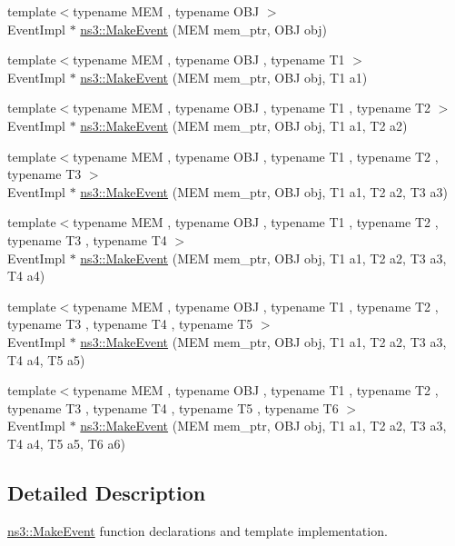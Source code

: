 {\bf }\par
\begin{DoxyCompactItemize}
\item 
{\footnotesize template$<$typename M\+EM , typename O\+BJ $>$ }\\Event\+Impl $\ast$ \hyperlink{group__makeeventmemptr_ga0e2905b2f105d6626b91262ed831c6fa}{ns3\+::\+Make\+Event} (M\+EM mem\+\_\+ptr, O\+BJ obj)
\item 
{\footnotesize template$<$typename M\+EM , typename O\+BJ , typename T1 $>$ }\\Event\+Impl $\ast$ \hyperlink{group__makeeventmemptr_ga910b4f11ac95304bc98e165f17c39126}{ns3\+::\+Make\+Event} (M\+EM mem\+\_\+ptr, O\+BJ obj, T1 a1)
\item 
{\footnotesize template$<$typename M\+EM , typename O\+BJ , typename T1 , typename T2 $>$ }\\Event\+Impl $\ast$ \hyperlink{group__makeeventmemptr_ga3e867e45d5a45ba42ab0648d999c71c4}{ns3\+::\+Make\+Event} (M\+EM mem\+\_\+ptr, O\+BJ obj, T1 a1, T2 a2)
\item 
{\footnotesize template$<$typename M\+EM , typename O\+BJ , typename T1 , typename T2 , typename T3 $>$ }\\Event\+Impl $\ast$ \hyperlink{group__makeeventmemptr_ga845eade6a6e8eee2b7c45225fe9816b2}{ns3\+::\+Make\+Event} (M\+EM mem\+\_\+ptr, O\+BJ obj, T1 a1, T2 a2, T3 a3)
\item 
{\footnotesize template$<$typename M\+EM , typename O\+BJ , typename T1 , typename T2 , typename T3 , typename T4 $>$ }\\Event\+Impl $\ast$ \hyperlink{group__makeeventmemptr_gaff41581be22a030416d7463f7ff7dfe8}{ns3\+::\+Make\+Event} (M\+EM mem\+\_\+ptr, O\+BJ obj, T1 a1, T2 a2, T3 a3, T4 a4)
\item 
{\footnotesize template$<$typename M\+EM , typename O\+BJ , typename T1 , typename T2 , typename T3 , typename T4 , typename T5 $>$ }\\Event\+Impl $\ast$ \hyperlink{group__makeeventmemptr_gade123cc667e303dc07f74c7d8f4838cc}{ns3\+::\+Make\+Event} (M\+EM mem\+\_\+ptr, O\+BJ obj, T1 a1, T2 a2, T3 a3, T4 a4, T5 a5)
\item 
{\footnotesize template$<$typename M\+EM , typename O\+BJ , typename T1 , typename T2 , typename T3 , typename T4 , typename T5 , typename T6 $>$ }\\Event\+Impl $\ast$ \hyperlink{group__makeeventmemptr_gaeb347f342e4aaf368fcc47f8229260a9}{ns3\+::\+Make\+Event} (M\+EM mem\+\_\+ptr, O\+BJ obj, T1 a1, T2 a2, T3 a3, T4 a4, T5 a5, T6 a6)
\end{DoxyCompactItemize}



\subsection{Detailed Description}
\hyperlink{group__makeeventfnptr_ga289a28a2497c18a9bd299e5e2014094b}{ns3\+::\+Make\+Event} function declarations and template implementation. 